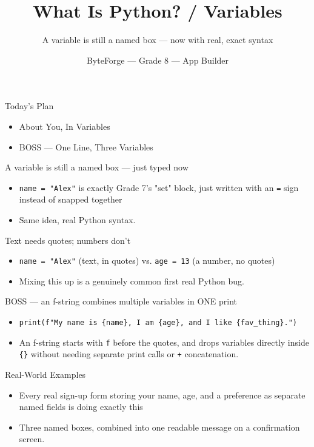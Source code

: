 \documentclass[aspectratio=169]{beamer}
\title{What Is Python? / Variables}
\subtitle{A variable is still a named box — now with real, exact syntax}
\author{ByteForge --- Grade 8 --- App Builder}
\date{}
\begin{document}
\begin{frame}
    \titlepage
\end{frame}

\begin{frame}{Today's Plan}
    \begin{itemize}
        \item About You, In Variables
        \item[$\bigstar$] BOSS --- One Line, Three Variables
    \end{itemize}
\end{frame}

\begin{frame}{A variable is still a named box — just typed now}
    \large
    \begin{itemize}
        \item \texttt{name = "Alex"} is exactly Grade 7's "set" block, just written with an \texttt{=} sign instead of snapped together
        \item Same idea, real Python syntax.
    \end{itemize}
\end{frame}


\begin{frame}{Text needs quotes; numbers don't}
    \large
    \begin{itemize}
        \item \texttt{name = "Alex"} (text, in quotes) vs. \texttt{age = 13} (a number, no quotes)
        \item Mixing this up is a genuinely common first real Python bug.
    \end{itemize}
\end{frame}


\begin{frame}{BOSS — an f-string combines multiple variables in ONE print}
    \large
    \begin{itemize}
        \item \texttt{print(f"My name is \{name\}, I am \{age\}, and I like \{fav\_thing\}.")}
        \item An f-string starts with \texttt{f} before the quotes, and drops variables directly inside \texttt{\{\}} without needing separate print calls or \texttt{+} concatenation.
    \end{itemize}
\end{frame}

\begin{frame}{Real-World Examples}
    \large
    \begin{itemize}
        \item Every real sign-up form storing your name, age, and a preference as separate named fields is doing exactly this
        \item Three named boxes, combined into one readable message on a confirmation screen.
    \end{itemize}
\end{frame}
\end{document}
